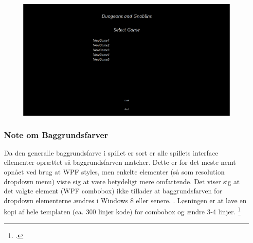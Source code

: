 \begin{figure}[h]
\centering
\includegraphics[width = \textwidth]{02-Body/Images/LoadMenu_final.png}
\caption{}
\label{fig:Design-FE-impl-load}
\end{figure}

\subsubsection{Note om Baggrundsfarver}
Da den generalle baggrundsfarve i spillet er sort er alle spillets interface ellementer oprættet så baggrundsfarven matcher. Dette er for det meste nemt opnået ved brug at WPF styles, men enkelte elementer (så som resolution dropdown menu) viste sig at være betydeligt mere omfattende. Det viser sig at det valgte element (WPF combobox) ikke tillader at baggrundsfarven for dropdown elementerne ændres i Windows 8 eller senere. . Løsningen er at lave en kopi af hele templaten (ca. 300 linjer kode) for combobox og ændre 3-4 linjer. \footcite{https://social.technet.microsoft.com/wiki/contents/articles/24240.changing-the-background-color-of-a-combobox-in-wpf-on-windows-8.aspx}

\newpage
